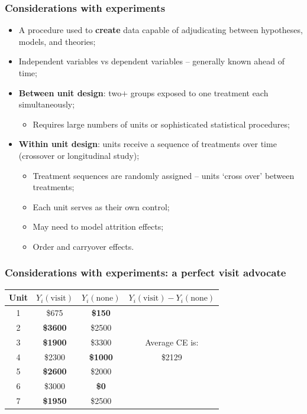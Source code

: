 \documentclass[aspectratio=169]{beamer}
\theoremstyle{principle}
\begin{document}
\begin{frame}
\frametitle{Considerations with experiments}

\begin{itemize}
\item A procedure used to \textbf{create} data capable of adjudicating between hypotheses, models, and theories;
\bigskip

\item Independent variables vs dependent variables -- generally known ahead of time;
\bigskip

\item \textbf{Between unit design}: two$+$ groups exposed to one treatment each simultaneously;
\begin{itemize}
\item Requires large numbers of units or sophisticated statistical procedures; 
\end{itemize}
\bigskip
\item \textbf{Within unit design}: units receive a sequence of treatments over time (crossover or longitudinal study);
\begin{itemize}
\item Treatment sequences are randomly assigned -- units `cross over' between treatments; 
\item Each unit serves as their own control;
\item May need to model attrition effects;
\item Order and carryover effects.
\end{itemize}
\end{itemize}

\end{frame}

\begin{frame}
\frametitle{Considerations with experiments: a perfect visit advocate}
\huge
\begin{table}
\begin{tabular}{ c | c | c | c}
Unit & $Y_i(\mbox{visit})$ & $Y_i(\mbox{none})$ & \color{white}$Y_i(\mbox{visit}) - Y_i(\mbox{none})$ \\
\hline
\hline
  1 & \color{gray}\$675 & \textbf{\$150} & \\
  2 & \textbf{\$3600} & \color{gray}\$2500 & \\
  3 & \textbf{\$1900} & \color{gray}\$3300 &Average CE is: \\
  4 & \color{gray}\$2300 & \textbf{\$1000} & \$2129\\
  5 & \textbf{\$2600} & \color{gray}\$2000 & \\
  6 & \color{gray}\$3000 & \textbf{\$0} & \\
  7 & \textbf{\$1950} & \color{gray}\$2500 & \\
\hline
\hline
\end{tabular}
\end{table}

\end{frame}
\end{document}
